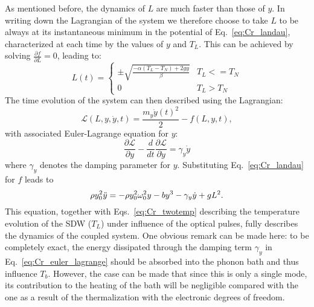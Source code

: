 As mentioned before, the dynamics of $L$ are much faster than those of $y$.
In writing down the Lagrangian of the system we therefore choose to take $L$ to be always at its instantaneous minimum in the potential of Eq.~\eqref{eq:Cr_landau}, characterized at each time by the values of $y$ and $T_L$.
This can be achieved by solving $\frac{\partial f}{\partial L} = 0$, leading to:
\begin{equation}
	\label{eq:Cr_L0}
	L(t) =
	\begin{cases}
		\pm \sqrt{\frac{- \alpha (T_L - T_N) + 2 g y}{\beta}} & T_L <= T_N\\
		0 & T_L > T_N
	\end{cases}
\end{equation}
The time evolution of the system can then described using the Lagrangian:
\begin{equation}
    \mathcal{L}(L, y, \dot{y}, t) = \frac{m_y \dot{y}(t)^2}{2} - f(L, y, t),
\end{equation}
with associated Euler-Lagrange equation for $y$:
\begin{equation}
    \frac{\partial \mathcal{L}}{\partial y} - \frac{d}{dt}\frac{\partial \mathcal{L}}{\partial \dot{y}} = \gamma_y \dot{y}
\end{equation}
where $\gamma_y$ denotes the damping parameter for $y$.
Substituting Eq.~\eqref{eq:Cr_landau} for $f$ leads to 
\begin{equation}
	\label{eq:Cr_euler_lagrange}
	    \rho y_0^2 \Ddot{y} = -\rho y_0^2 \omega_0^2 y  - b y^3 - \gamma_y \dot{y} + gL^2.
\end{equation}
This equation, together with Eqs.~\ref{eq:Cr_twotemp} describing the temperature evolution of the SDW ($T_L$) under influence of the optical pulses, fully describes the dynamics of the coupled system.
One obvious remark can be made here: to be completely exact, the energy dissipated through the damping term $\gamma_y$ in Eq.~\eqref{eq:Cr_euler_lagrange} should be absorbed into the phonon bath and thus influence $T_b$.
However, the case can be made that since this is only a single mode, its contribution to the heating of the bath will be negligible compared with the one as a result of the thermalization with the electronic degrees of freedom.

